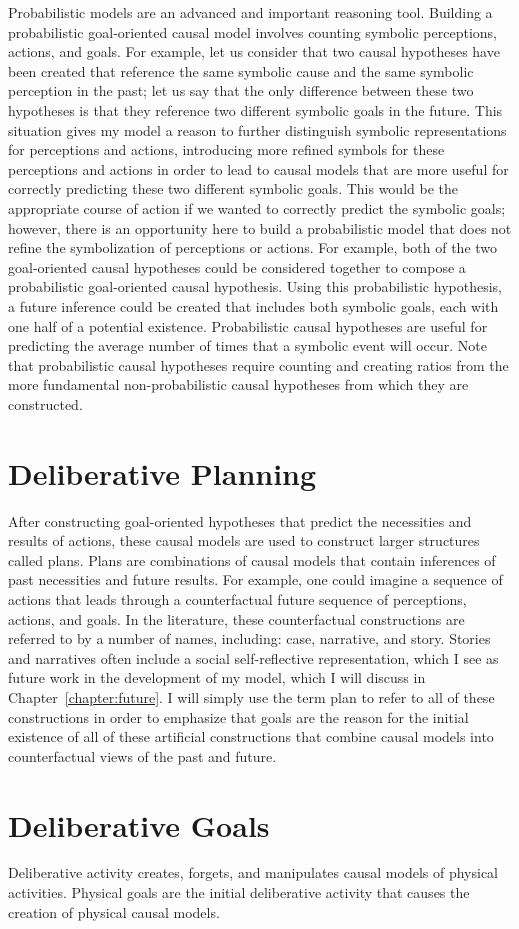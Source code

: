 Probabilistic models are an advanced and important reasoning tool.
Building a probabilistic goal-oriented causal model involves counting
symbolic perceptions, actions, and goals.  For example, let us
consider that two causal hypotheses have been created that reference
the same symbolic cause and the same symbolic perception in the past;
let us say that the only difference between these two hypotheses is
that they reference two different symbolic goals in the future.  This
situation gives my model a reason to further distinguish symbolic
representations for perceptions and actions, introducing more refined
symbols for these perceptions and actions in order to lead to causal
models that are more useful for correctly predicting these two
different symbolic goals.  This would be the appropriate course of
action if we wanted to correctly predict the symbolic goals; however,
there is an opportunity here to build a probabilistic model that does
not refine the symbolization of perceptions or actions.  For example,
both of the two goal-oriented causal hypotheses could be considered
together to compose a probabilistic goal-oriented causal hypothesis.
Using this probabilistic hypothesis, a future inference could be
created that includes both symbolic goals, each with one half of a
potential existence.  Probabilistic causal hypotheses are useful for
predicting the average number of times that a symbolic event will
occur.  Note that probabilistic causal hypotheses require counting and
creating ratios from the more fundamental non-probabilistic causal
hypotheses from which they are constructed.

\section{Deliberative Planning}

After constructing goal-oriented hypotheses that predict the
necessities and results of actions, these causal models are used to
construct larger structures called plans.  Plans are combinations of
causal models that contain inferences of past necessities and future
results.  For example, one could imagine a sequence of actions that
leads through a counterfactual future sequence of perceptions,
actions, and goals.  In the literature, these counterfactual
constructions are referred to by a number of names, including: case,
narrative, and story.  Stories and narratives often include a social
self-reflective representation, which I see as future work in the
development of my model, which I will discuss in
Chapter~\ref{chapter:future}.  I will simply use the term plan to
refer to all of these constructions in order to emphasize that goals
are the reason for the initial existence of all of these artificial
constructions that combine causal models into counterfactual views of
the past and future.

\section{Deliberative Goals}

Deliberative activity creates, forgets, and manipulates causal models
of physical activities.  Physical goals are the initial deliberative
activity that causes the creation of physical causal models.




